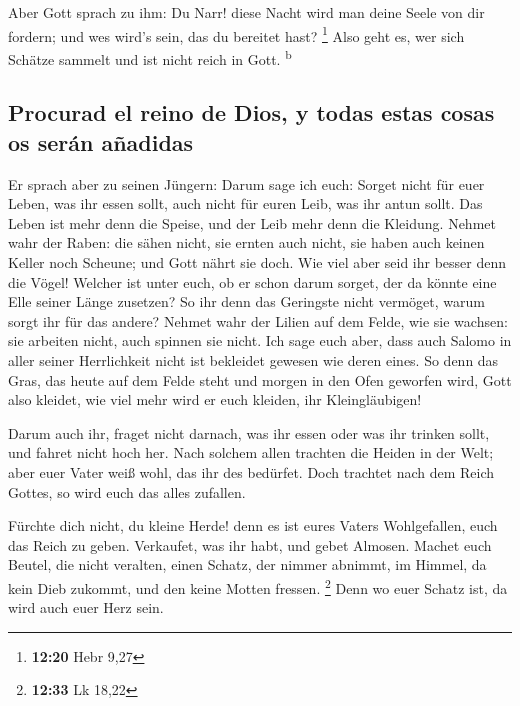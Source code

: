  Aber Gott sprach zu ihm: Du Narr! diese Nacht wird man
deine Seele von dir fordern; und wes wird's sein, das du bereitet hast?
\footnote{\textbf{12:20} Hebr 9,27}  Also geht es, wer
sich Schätze sammelt und ist nicht reich in Gott. \textsuperscript{b}

\hypertarget{procurad-el-reino-de-dios-y-todas-estas-cosas-os-seruxe1n-auxf1adidas}{%
\subsection{Procurad el reino de Dios, y todas estas cosas os serán
añadidas}\label{procurad-el-reino-de-dios-y-todas-estas-cosas-os-seruxe1n-auxf1adidas}}

 Er sprach aber zu seinen Jüngern: Darum sage ich euch:
Sorget nicht für euer Leben, was ihr essen sollt, auch nicht für euren
Leib, was ihr antun sollt.  Das Leben ist mehr denn die
Speise, und der Leib mehr denn die Kleidung.  Nehmet wahr
der Raben: die sähen nicht, sie ernten auch nicht, sie haben auch keinen
Keller noch Scheune; und Gott nährt sie doch. Wie viel aber seid ihr
besser denn die Vögel!  Welcher ist unter euch, ob er
schon darum sorget, der da könnte eine Elle seiner Länge zusetzen?
 So ihr denn das Geringste nicht vermöget, warum sorgt
ihr für das andere?  Nehmet wahr der Lilien auf dem
Felde, wie sie wachsen: sie arbeiten nicht, auch spinnen sie nicht. Ich
sage euch aber, dass auch Salomo in aller seiner Herrlichkeit nicht ist
bekleidet gewesen wie deren eines.  So denn das Gras, das
heute auf dem Felde steht und morgen in den Ofen geworfen wird, Gott
also kleidet, wie viel mehr wird er euch kleiden, ihr Kleingläubigen!

 Darum auch ihr, fraget nicht darnach, was ihr essen oder
was ihr trinken sollt, und fahret nicht hoch her.  Nach
solchem allen trachten die Heiden in der Welt; aber euer Vater weiß
wohl, das ihr des bedürfet.  Doch trachtet nach dem Reich
Gottes, so wird euch das alles zufallen.

 Fürchte dich nicht, du kleine Herde! denn es ist eures
Vaters Wohlgefallen, euch das Reich zu geben.  Verkaufet,
was ihr habt, und gebet Almosen. Machet euch Beutel, die nicht veralten,
einen Schatz, der nimmer abnimmt, im Himmel, da kein Dieb zukommt, und
den keine Motten fressen. \footnote{\textbf{12:33} Lk 18,22}
 Denn wo euer Schatz ist, da wird auch euer Herz sein.

